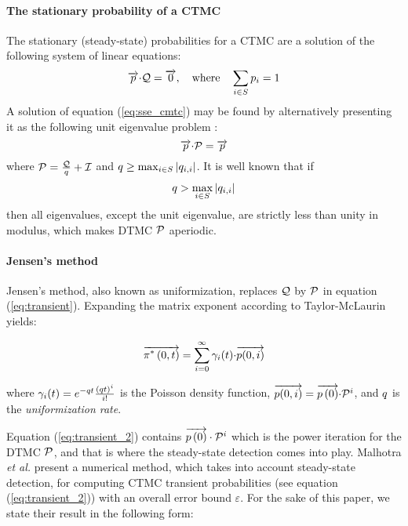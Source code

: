 \documentclass[times, 10pt,twocolumn]{article}
\begin{document}
	\paragraph{The stationary probability of a CTMC}
		The stationary (steady-state) probabilities for a CTMC are a solution of the following system of linear equations:
		\begin{equation}
			\overrightarrow{p} {\cdot} \mathcal{Q} = \overrightarrow{0}, \quad \text{where} \quad \sum_{i \in S} p_{i} = 1
			\label{eq:sse_cmtc}
		\end{equation}
		A solution of equation (\ref{eq:sse_cmtc}) may be found by alternatively presenting it as the following unit eigenvalue problem \cite{Stewart_ACM78}:
		\begin{equation}
			\overrightarrow{p}{\cdot}\mathcal{P} = \overrightarrow{p}
			\nonumber
		\end{equation}
		where $\mathcal{P}=\frac{\mathcal{Q}}{q}+\mathcal{I}$ and $q \geq \max_{i \in S}| q_{i,i} |$.  It is well known \cite{Stewart_ACM78} that if
		\begin{equation}
			q > \max_{i \in S} |q_{i,i}|
			\nonumber
		\end{equation}
		then all eigenvalues, except the unit eigenvalue, are strictly less than unity in modulus, which makes DTMC $\mathcal{P}$ aperiodic.

	\paragraph{Jensen's method}
		 Jensen's method, also known as uniformization, replaces $\mathcal{Q}$ by $\mathcal{P}$ in equation (\ref{eq:transient}).  Expanding the matrix exponent according to Taylor-McLaurin yields:

		\begin{equation}
			\overrightarrow{\pi^{*} \left(0, t \right )} = \sum_{i=0}^{\infty}\gamma_{i}(t) {\cdot} \overrightarrow{p(0,i)}
			\label{eq:transient_2}
		\end{equation}

		where $\gamma_{i}(t) = e^{-q t}\frac{\left( q t \right)^{i}}{i!}$ is the Poisson density function, $\overrightarrow{p(0,i)} = \overrightarrow{p \left( 0 \right)} {\cdot} \mathcal{P}^{i}$, and $q$ is the \emph{uniformization rate}.

		Equation (\ref{eq:transient_2}) contains $\overrightarrow{p \left( 0 \right)} \cdot \mathcal{P}^{i}$ which is the power iteration for the DTMC $\mathcal{P}$, and that is where the steady-state detection comes into play.  Malhotra \emph{et al.} \cite{MalhotraMT_MR94} present a numerical method, which takes into account steady-state detection, for computing CTMC transient probabilities (see equation (\ref{eq:transient_2})) with an overall error bound $\varepsilon$.  For the sake of this paper, we state their result in the following form:
\end{document}
